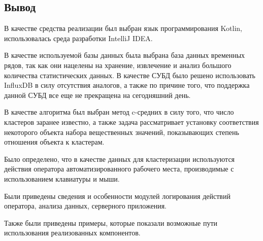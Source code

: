 \subsection*{Вывод}
В качестве средства реализации был выбран язык программирования Kotlin, использовалась среда разработки IntelliJ IDEA.

В качестве используемой базы данных была выбрана база данных временных рядов, так как они нацелены на хранение, извлечение и анализ большого количества статистических данных. В качестве СУБД было решено использовать InfluxDB в силу отсутствия аналогов, а также по причине того, что поддержка данной СУБД все еще не прекращена на сегодняшний день.

В качестве алгоритма был выбран метод c-средних в силу того, что число кластеров заранее известно, а также задача рассматривает установку соответствия некоторого объекта набора вещественных значений, показывающих степень отношения объекта к кластерам.

Было определено, что в качестве данных для кластеризации используются действия оператора автоматизированного рабочего места, производимые с использованием клавиатуры и мыши.

Были приведены сведения и особенности модулей логирования действий оператора, анализа данных, серверного приложения.

Также были приведены примеры, которые показали возможные пути использования реализованных компонентов.
